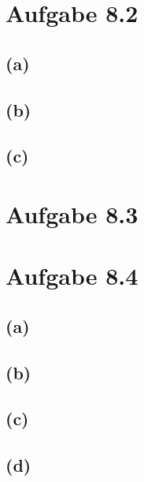 \documentclass[12pt]{article}
\begin{document}
\section{Aufgabe 8.2}
\subsection{(a)}

\subsection{(b)}

\subsection{(c)}

\section{Aufgabe 8.3}

\section{Aufgabe 8.4}
\subsection{(a)}

\subsection{(b)}

\subsection{(c)}

\subsection{(d)}
\end{document}
